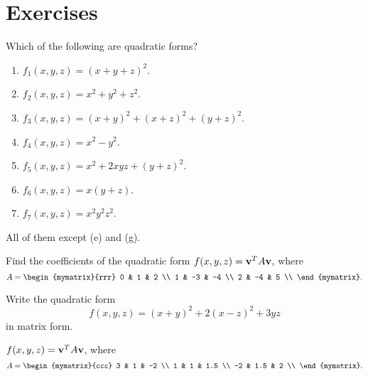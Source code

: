 \section*{Exercises}

\begin{ex}
  Which of the following are quadratic forms?
  \begin{enumerate}
  \item $f_1(x,y,z) = (x+y+z)^2$.
  \item $f_2(x,y,z) = x^2 + y^2 + z^2$.
  \item $f_3(x,y,z) = (x+y)^2 + (x+z)^2 + (y+z)^2$.
  \item $f_4(x,y,z) = x^2 - y^2$.
  \item $f_5(x,y,z) = x^2 + 2xyz + (y+z)^2$.
  \item $f_6(x,y,z) = x(y+z)$.
  \item $f_7(x,y,z) = x^2y^2z^2$.
  \end{enumerate}
  \begin{sol}
    All of them except (e) and (g).
  \end{sol}
\end{ex}

\begin{ex}
  Find the coefficients of the quadratic form
  $f(x,y,z) = \vect{v}^T A\vect{v}$, where
  \begin{equation*}
    A = \begin{mymatrix}{rrr}
      0 &  1 &  2 \\
      1 & -3 & -4 \\
      2 & -4 &  5 \\
    \end{mymatrix}.
  \end{equation*}
\end{ex}

\begin{ex}
  Write the quadratic form
  \begin{equation*}
    f(x,y,z) = (x+y)^2 + 2(x-z)^2 + 3yz
  \end{equation*}
  in matrix form.
  \begin{sol}
    $f(x,y,z) = \vect{v}^T A\vect{v}$, where
    \begin{equation*}
      A = \begin{mymatrix}{ccc}
        3  &  1  & -2  \\
        1  &  1  & 1.5 \\
        -2 & 1.5 &  2  \\
      \end{mymatrix}.
    \end{equation*}
  \end{sol}
\end{ex}

